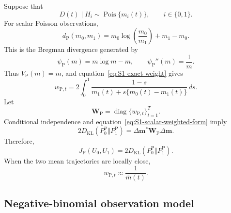 Suppose that
\[
D(t)\mid H_i
\sim
\operatorname{Pois}\{m_i(t)\},
\qquad i\in\{0,1\}.
\]
For scalar Poisson observations,
\[
d_{\mathrm P}(m_0,m_1) = m_0\log\left(\frac{m_0}{m_1}\right)+m_1-m_0.
\]
This is the Bregman divergence generated by
\[
\psi_{\mathrm P}(m)=m\log m-m,
\qquad
\psi_{\mathrm P}''(m)=\frac{1}{m}.
\]
Thus \(V_{\mathrm P}(m)=m\), and equation~\eqref{eq:S1-exact-weight} gives
\begin{equation}
w_{\mathrm P,t}
=
2\int_0^1
\frac{1-s}{m_1(t)+s\{m_0(t)-m_1(t)\}}\,ds.
\label{eq:S1-Poisson-weight}
\end{equation}
Let
\[
\mathbf W_{\mathrm P}
=
\operatorname{diag}\{w_{\mathrm P,t}\}_{t=1}^T .
\]
Conditional independence and equation~\eqref{eq:S1-scalar-weighted-form} imply
\begin{equation}
2D_{\mathrm{KL}}(P_0^{\mathrm P}\Vert P_1^{\mathrm P})
=
\Delta\mathbf m^*
\mathbf W_{\mathrm P}
\Delta\mathbf m.
\label{eq:S1-Poisson-KL-weighted}
\end{equation}
Therefore,
\[
J_{\mathrm P}(U_0,U_1) = 2D_{\mathrm{KL}}(P_0^{\mathrm P}\Vert P_1^{\mathrm P}).
\]
When the two mean trajectories are locally close,
\[
w_{\mathrm P,t}\approx \frac{1}{\bar m(t)}.
\]

\subsection{Negative-binomial observation model}

